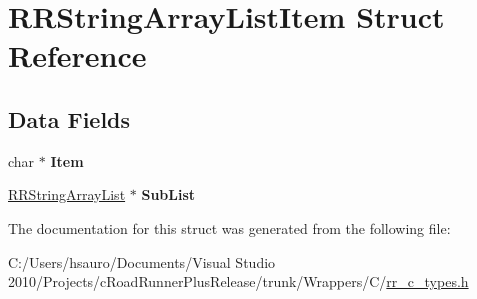 \hypertarget{struct_r_r_string_array_list_item}{
\section{\-R\-R\-String\-Array\-List\-Item \-Struct \-Reference}
\label{struct_r_r_string_array_list_item}
}
\subsection*{\-Data \-Fields}
\begin{DoxyCompactItemize}
\item 
\hypertarget{struct_r_r_string_array_list_item_a244b3f4d5a24f0cae10de599fe62c889}{
char $\ast$ {\bfseries \-Item}}
\label{struct_r_r_string_array_list_item_a244b3f4d5a24f0cae10de599fe62c889}

\item 
\hypertarget{struct_r_r_string_array_list_item_a933c5818b994da50f225a40b967fb661}{
\hyperlink{struct_r_r_string_array_list}{\-R\-R\-String\-Array\-List} $\ast$ {\bfseries \-Sub\-List}}
\label{struct_r_r_string_array_list_item_a933c5818b994da50f225a40b967fb661}

\end{DoxyCompactItemize}


\-The documentation for this struct was generated from the following file\-:\begin{DoxyCompactItemize}
\item 
\-C\-:/\-Users/hsauro/\-Documents/\-Visual Studio 2010/\-Projects/c\-Road\-Runner\-Plus\-Release/trunk/\-Wrappers/\-C/\hyperlink{rr__c__types_8h}{rr\-\_\-c\-\_\-types.\-h}\end{DoxyCompactItemize}
